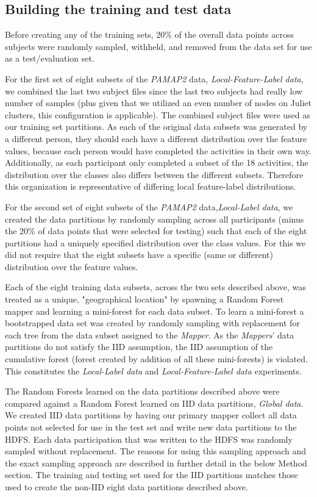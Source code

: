 \documentclass{sig-alternate-05-2015}
\begin{document}
\subsection{Building the training and test data}
Before creating any of the training sets, 20\% of the overall data points across subjects were randomly sampled, withheld, and removed from the data set for use as a test/evaluation set.

For the first set of eight subsets of the \textit{PAMAP2} data, \textit{Local-Feature-Label data}, we combined the last two subject files since the last two subjects had really low number of samples (plus given that we utilized an even number of nodes on Juliet clusters, this configuration is applicable). The combined subject files were used as our training set partitions. As each of the original data subsets was generated by a different person, they should each have a different distribution over the feature values, because each person would have completed the activities in their own way. Additionally, as each participant only completed a subset of the 18 activities, the distribution over the classes also differs between the different subsets. Therefore this organization is representative of differing local feature-label distributions.

For the second set of eight subsets of the \textit{PAMAP2} data,\textit{Local-Label data}, we created the data partitions by randomly sampling across all participants (minus the 20\% of data points that were selected for testing) such that each of the eight partitions had a uniquely specified distribution over the class values. For this we did not require that the eight subsets have a specific (same or different) distribution over the feature values. 

Each of the eight training data subsets, across the two sets described above, was treated as a unique, "geographical location" by spawning a Random Forest mapper and learning a mini-forest for each data subset. To learn a mini-forest a bootstrapped data set was created by randomly sampling with replacement for each tree from the data subset assigned to the \textit{Mapper}. As the \textit{Mappers}' data partitions do not satisfy the IID assumption, the IID assumption of the cumulative forest (forest created by addition of all these mini-forests) is violated. This constitutes the \textit{Local-Label data} and \textit{Local-Feature-Label data} experiments. 

The Random Forests learned on the data partitions described above were compared against a Random Forest learned on IID data partitions, \textit{Global data}. We created IID data partitions by having our primary mapper collect all data points not selected for use in the test set and write new data partitions to the HDFS. Each data participation that was written to the HDFS was randomly sampled without replacement. The reasons for using this sampling approach and the exact sampling approach are described in further detail in the below Method section. The training and testing set used for the IID partitions matches those used to create the non-IID eight data partitions described above.
\end{document}
